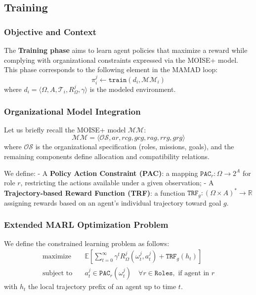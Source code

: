 \documentclass[pdflatex,sn-mathphys-num]{sn-jnl}%
\theoremstyle{thmstyleone}%
\theoremstyle{thmstyletwo}%
\theoremstyle{thmstylethree}%
\begin{document}
\subsection{Training}

\subsubsection*{Objective and Context}

The \textbf{Training phase} aims to learn agent policies that maximize a reward while complying with organizational constraints expressed via the MOISE+ model. This phase corresponds to the following element in the MAMAD loop:
\[
\pi^j_i \gets \texttt{train}(d_i, \mathcal{MM}_i)
\]
where \( d_i = \langle \Omega, A, \mathcal{T}_i, R^j_\Omega, \gamma \rangle \) is the modeled environment.

\subsubsection*{Organizational Model Integration}

Let us briefly recall the MOISE+ model $\mathcal{MM}$:
\[
\mathcal{MM} = \langle \mathcal{OS}, ar, rcg, gcg, rag, rrg, grg \rangle
\]
where $\mathcal{OS}$ is the organizational specification (roles, missions, goals), and the remaining components define allocation and compatibility relations.

We define:
- A \textbf{Policy Action Constraint (PAC)}: a mapping $\texttt{PAC}_r : \Omega \rightarrow 2^{A}$ for role \( r \), restricting the actions available under a given observation;
- A \textbf{Trajectory-based Reward Function (TRF)}: a function \( \texttt{TRF}_g : (\Omega \times A)^* \rightarrow \mathbb{R} \) assigning rewards based on an agent's individual trajectory toward goal \( g \).

\subsubsection*{Extended MARL Optimization Problem}

We define the constrained learning problem as follows:
\[
\begin{aligned}
\text{maximize} \quad & \mathbb{E} \left[ \sum_{t=0}^\infty \gamma^t R^j_\Omega(\omega^j_t, a^j_t) + \texttt{TRF}_g(h_t) \right] \\
\text{subject to} \quad & a^j_t \in \texttt{PAC}_r(\omega^j_t) \quad \forall r \in \texttt{Roles}, \text{ if agent in } r
\end{aligned}
\]
with \( h_t \) the local trajectory prefix of an agent up to time \( t \).
\end{document}
